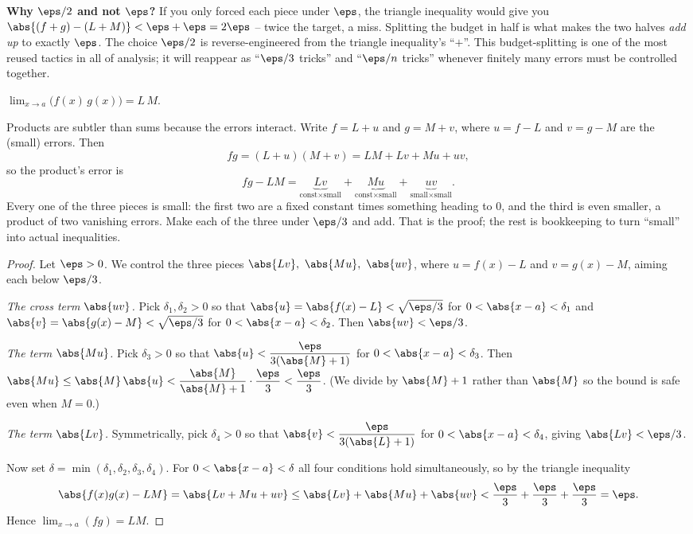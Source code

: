 \begin{trapbox}
\textbf{Why $\eps/2$ and not $\eps$?} If you only forced each piece under $\eps$,
the triangle inequality would give you $\abs{(f+g)-(L+M)} < \eps+\eps = 2\eps$ --
twice the target, a miss. Splitting the budget in half is what makes the two
halves \emph{add up} to exactly $\eps$. The choice $\eps/2$ is reverse-engineered
from the triangle inequality's ``$+$''. This budget-splitting is one of the most
reused tactics in all of analysis; it will reappear as ``$\eps/3$ tricks'' and
``$\eps/n$ tricks'' whenever finitely many errors must be controlled together.
\end{trapbox}

\begin{theorem}
\label{ch06:thm-prod}
$\displaystyle \lim_{x\to a}\big(f(x)\,g(x)\big) = L\,M.$
\end{theorem}

\begin{intuitionbox}
Products are subtler than sums because the errors interact. Write $f = L + u$ and
$g = M + v$, where $u=f-L$ and $v=g-M$ are the (small) errors. Then
\[
  fg = (L+u)(M+v) = LM + Lv + Mu + uv,
\]
so the product's error is
\[
  fg - LM = \underbrace{Lv}_{\text{const}\times\text{small}}
  + \underbrace{Mu}_{\text{const}\times\text{small}}
  + \underbrace{uv}_{\text{small}\times\text{small}}.
\]
Every one of the three pieces is small: the first two are a fixed constant times
something heading to $0$, and the third is even smaller, a product of two
vanishing errors. Make each of the three under $\eps/3$ and add. That is the
proof; the rest is bookkeeping to turn ``small'' into actual inequalities.
\end{intuitionbox}

\begin{proof}
Let $\eps>0$. We control the three pieces $\abs{Lv},\ \abs{Mu},\ \abs{uv}$, where
$u=f(x)-L$ and $v=g(x)-M$, aiming each below $\eps/3$.

\emph{The cross term $\abs{uv}$.} Pick $\delta_1,\delta_2>0$ so that
$\abs{u}=\abs{f(x)-L}<\sqrt{\eps/3}$ for $0<\abs{x-a}<\delta_1$ and
$\abs{v}=\abs{g(x)-M}<\sqrt{\eps/3}$ for $0<\abs{x-a}<\delta_2$. Then
$\abs{uv}<\eps/3$.

\emph{The term $\abs{Mu}$.} Pick $\delta_3>0$ so that $\abs{u}<\dfrac{\eps}{3(\abs{M}+1)}$
for $0<\abs{x-a}<\delta_3$. Then $\abs{Mu}\le\abs{M}\,\abs{u} <
\dfrac{\abs{M}}{\abs{M}+1}\cdot\dfrac{\eps}{3} < \dfrac{\eps}{3}$. (We divide by
$\abs{M}+1$ rather than $\abs{M}$ so the bound is safe even when $M=0$.)

\emph{The term $\abs{Lv}$.} Symmetrically, pick $\delta_4>0$ so that
$\abs{v}<\dfrac{\eps}{3(\abs{L}+1)}$ for $0<\abs{x-a}<\delta_4$, giving
$\abs{Lv}<\eps/3$.

Now set $\delta=\min(\delta_1,\delta_2,\delta_3,\delta_4)$. For
$0<\abs{x-a}<\delta$ all four conditions hold simultaneously, so by the triangle
inequality
\[
  \abs{f(x)g(x)-LM} = \abs{Lv + Mu + uv}
  \le \abs{Lv}+\abs{Mu}+\abs{uv}
  < \frac{\eps}{3}+\frac{\eps}{3}+\frac{\eps}{3} = \eps.
\]
Hence $\lim_{x\to a}(fg)=LM$.
\end{proof}

